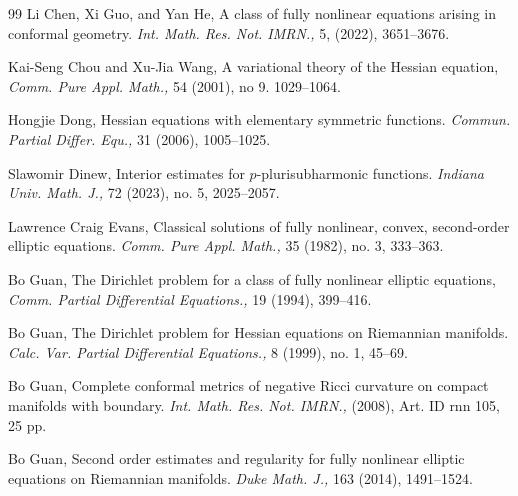 \documentclass{article}
\theoremstyle{plain}
\theoremstyle{definition}
\theoremstyle{definition}
\numberwithin{equation}{section}
\begin{document}
\begin{sloppypar}
\begin{thebibliography}{99}
 Li Chen, Xi Guo, and Yan He, A class of fully nonlinear equations arising in conformal geometry. 
{\em Int. Math. Res. Not. IMRN.,} 
5, (2022), 3651--3676. 



  Kai-Seng Chou and Xu-Jia Wang, A variational theory of the Hessian equation, {\em Comm. Pure Appl. Math.,} 54 (2001), no 9. 1029--1064. 

  Hongjie Dong, Hessian equations with elementary symmetric functions. {\em Commun. Partial Differ. Equ.,} 31 (2006), 1005--1025.


 Slawomir Dinew, Interior estimates for $p$-plurisubharmonic functions.  {\em Indiana Univ. Math. J.,} 72 (2023), no. 5, 2025--2057.






 

  Lawrence Craig Evans,  Classical solutions of fully nonlinear, convex, second-order elliptic equations.  {\em Comm. Pure Appl. Math.,} 35 (1982), no. 3, 333--363.

 


 Bo Guan,  The Dirichlet problem for a class of fully nonlinear elliptic equations, {\em Comm. Partial Differential Equations.,} 19  (1994), 399--416.

 Bo Guan, The Dirichlet problem for Hessian equations on Riemannian manifolds.  {\em Calc. Var. Partial Differential Equations.,}  8 (1999), no. 1, 45--69.

 Bo Guan, Complete conformal metrics of negative Ricci curvature on compact manifolds with boundary. {\em Int. Math. Res. Not. IMRN.,} (2008), Art. ID rnn 105, 25 pp.

 Bo Guan, Second order estimates and regularity for fully nonlinear elliptic equations on Riemannian manifolds. {\em Duke Math. J.,} 163 (2014), 1491--1524. 


\end{thebibliography}
\end{sloppypar}
\end{document}

